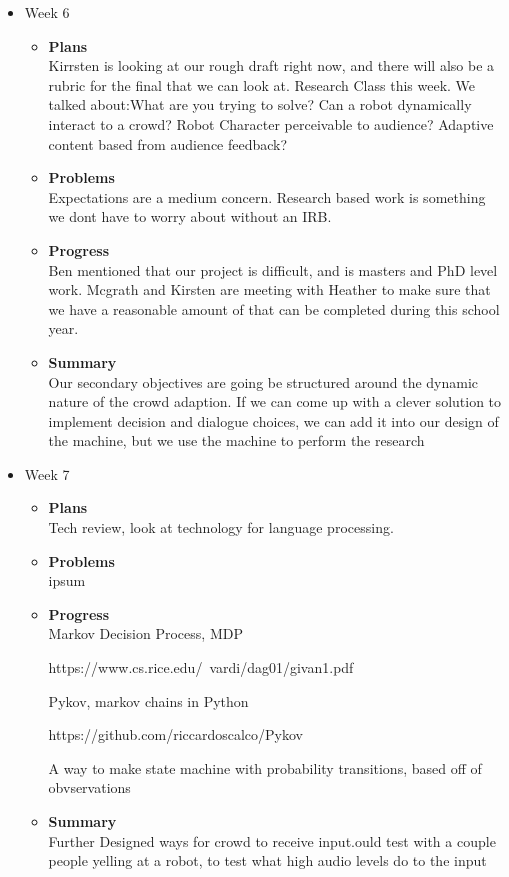 \begin{itemize}
		\item{Week 6}
			\begin{itemize}
				\item \textbf{Plans} \\
			Kirrsten is looking at our rough draft right now, and there will also be a rubric for the final that we can look at.
			Research Class this week. We talked about:What are you trying to solve? Can a robot dynamically interact to a crowd? Robot Character perceivable to audience? Adaptive content based from audience feedback?
				
				\item \textbf{Problems} \\
				Expectations are a medium concern. Research based work is something we dont have to worry about without an IRB.
				\item \textbf{Progress} \\
				
					Ben mentioned that our project is difficult, and is masters and PhD level work. Mcgrath and Kirsten are meeting with Heather to make sure that we have a reasonable amount of that can be completed during this school year. 
				\item \textbf{Summary} \\
					Our secondary objectives are going be structured around the dynamic nature of the crowd adaption. If we can come up with a clever solution to implement decision and dialogue choices, we can add it into our design of the machine, but we use the machine to perform the research 
				
			\end{itemize}

		\item{Week 7}
			\begin{itemize}
				\item \textbf{Plans} \\
				Tech review, look at technology for language processing.
				\item \textbf{Problems} \\
				ipsum
				\item \textbf{Progress} \\
				Markov Decision Process, MDP 

				https://www.cs.rice.edu/~vardi/dag01/givan1.pdf 

				Pykov, markov chains in Python  

				https://github.com/riccardoscalco/Pykov 

				A way to make state machine with probability transitions, based off of obvservations 
				\item \textbf{Summary} \\
				Further Designed ways for crowd to receive input.ould test with a couple people yelling at a robot, to test what high audio levels do to the input 
			\end{itemize}


\end{itemize}
